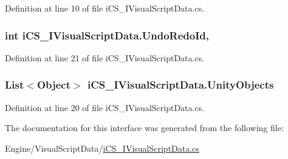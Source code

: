 Definition at line 10 of file i\+C\+S\+\_\+\+I\+Visual\+Script\+Data.\+cs.

\hypertarget{interfacei_c_s___i_visual_script_data_ae02959ac798ff21e2fa42cba487274ec}{
\subsubsection[{Undo\+Redo\+Id}]{\setlength{\rightskip}{0pt plus 5cm}int i\+C\+S\+\_\+\+I\+Visual\+Script\+Data.\+Undo\+Redo\+Id\hspace{0.3cm}{\ttfamily [get]}, {\ttfamily [set]}}}\label{interfacei_c_s___i_visual_script_data_ae02959ac798ff21e2fa42cba487274ec}


Definition at line 21 of file i\+C\+S\+\_\+\+I\+Visual\+Script\+Data.\+cs.

\hypertarget{interfacei_c_s___i_visual_script_data_a5eb5bf075c6fb73444afbc77b78ab6cd}{
\subsubsection[{Unity\+Objects}]{\setlength{\rightskip}{0pt plus 5cm}List$<${\bf Object}$>$ i\+C\+S\+\_\+\+I\+Visual\+Script\+Data.\+Unity\+Objects\hspace{0.3cm}{\ttfamily [get]}}}\label{interfacei_c_s___i_visual_script_data_a5eb5bf075c6fb73444afbc77b78ab6cd}


Definition at line 20 of file i\+C\+S\+\_\+\+I\+Visual\+Script\+Data.\+cs.



The documentation for this interface was generated from the following file\+:\begin{DoxyCompactItemize}
\item 
Engine/\+Visual\+Script\+Data/\hyperlink{i_c_s___i_visual_script_data_8cs}{i\+C\+S\+\_\+\+I\+Visual\+Script\+Data.\+cs}\end{DoxyCompactItemize}

